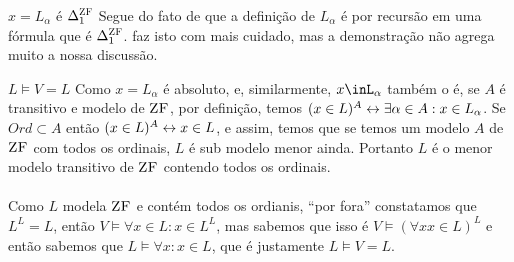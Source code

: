             \begin{lemma}{$x=L_\alpha$ é $\Delta^{\text{\sc ZF}}_{1}$}
                Segue do fato de que a definição de $L_\alpha$ é por recursão em uma fórmula que é $\Delta^{\text{\sc ZF}}_{1}$. \cite{Drake} faz isto 
                com mais cuidado, mas a demonstração não agrega muito a nossa discussão.
            \end{lemma}
            \begin{theorem}{$L\vDash V = L$}
                    Como $x = L_\alpha$ é absoluto, e, similarmente, $x\inL_\alpha$ também o é, se $A$ é transitivo e modelo de $\text{\sc ZF}$, por 
                    definição, temos $(x\in L)^A\leftrightarrow\exists\alpha\in A:x\in L_\alpha$. Se $Ord\subset A$ então $(x\in L)^A\leftrightarrow x\in L$, e 
                    assim, temos que se temos um modelo $A$ de $\text{\sc ZF}$ com todos os ordinais, $L$ é sub modelo menor ainda. Portanto $L$ é 
                    o menor modelo transitivo de $\text{\sc ZF}$ contendo todos os ordinais.
                \paragraph{} 
                    Como $L$ modela $\text{\sc ZF}$ e contém todos os ordianis, ``por fora'' constatamos que $L^L = L$, então 
                    $V\vDash \forall x\in L: x\in L^L$, mas sabemos que isso é $V\vDash(\forall x x\in L)^L$ e então
                    sabemos que $L\vDash\forall x: x\in L$, que é justamente $L\vDash V=L$.
            \end{theorem}
